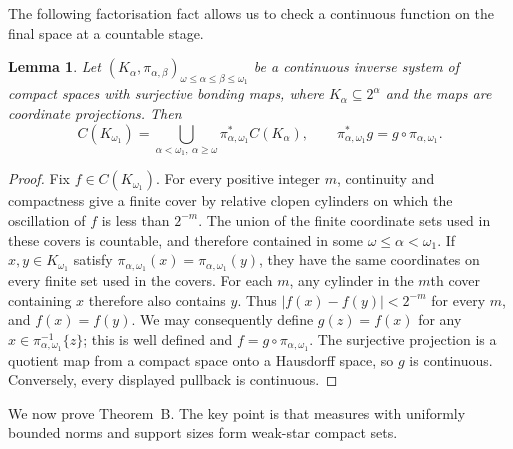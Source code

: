 \documentclass[a4paper,11pt]{amsart}
\theoremstyle{plain}
\newtheorem{lemma}[theorem]{Lemma}
\theoremstyle{definition}
\theoremstyle{remark}
\numberwithin{equation}{section}
\begin{document}
The following factorisation fact allows us to check a continuous function
on the final space at a countable stage.

\begin{lemma}\label{lem:factor}
Let $(K_\alpha,\pi_{\alpha,\beta})_{\omega\leqslant\alpha\leqslant\beta\leqslant\omega_1}$ be a continuous inverse system of compact spaces with surjective bonding maps, where $K_\alpha\subseteq2^\alpha$ and the maps are coordinate projections. Then
\[
C(K_{\omega_1})=\bigcup_{\alpha<\omega_1,\ \alpha\geqslant\omega}
\pi_{\alpha,\omega_1}^*C(K_\alpha),\qquad
\pi_{\alpha,\omega_1}^*g=g\circ\pi_{\alpha,\omega_1}.
\]
\end{lemma}
\begin{proof}
Fix $f\in C(K_{\omega_1})$. For every positive integer $m$, continuity and compactness give a finite cover by relative clopen cylinders on which the oscillation of $f$ is less than $2^{-m}$. The union of the finite coordinate sets used in these covers is countable, and therefore contained in some $\omega\leqslant\alpha<\omega_1$. If $x,y\in K_{\omega_1}$ satisfy
$\pi_{\alpha,\omega_1}(x)=\pi_{\alpha,\omega_1}(y)$, they have the same
coordinates on every finite set used in the covers. For each $m$, any
cylinder in the $m$th cover containing $x$ therefore also contains $y$.
Thus $|f(x)-f(y)|<2^{-m}$ for every $m$, and $f(x)=f(y)$.
We may consequently define
$g(z)=f(x)$ for any $x\in\pi_{\alpha,\omega_1}^{-1}\{z\}$;
this is well defined and $f=g\circ\pi_{\alpha,\omega_1}$. The surjective projection is a quotient map from a compact space onto a Hausdorff space, so $g$ is continuous. Conversely, every displayed pullback is continuous.
\end{proof}


We now prove Theorem~B. The key point is that measures with uniformly
bounded norms and support sizes form weak-star compact sets.
\end{document}
